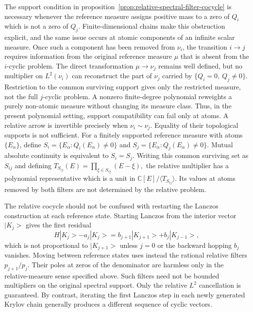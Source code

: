 \documentclass[a4paper,11pt]{article}
\def\ket#1{|#1>}%
\theoremstyle{definition}
\theoremstyle{remark}
\newcommand{\ket}[1]{|#1\rangle}
\newcommand{\CC}{\mathbb C}
\begin{document}
The support condition in proposition~\ref{prop:relative-spectral-filter-cocycle} is necessary whenever the reference measure assigns positive mass to a zero of $Q_i$ which is not a zero of $Q_j$. Finite-dimensional chains make this obstruction explicit, and the same issue occurs at atomic components of an infinite scalar measure. Once such a component has been removed from $\nu_i$, the transition $i\to j$ requires information from the original reference measure $\mu$ that is absent from the $i$-cyclic problem. The direct transformation $\mu\to\nu_j$ remains well defined, but no multiplier on $L^2(\nu_i)$ can reconstruct the part of $\nu_j$ carried by $\{Q_i=0,\ Q_j\ne0\}$. Restriction to the common surviving support gives only the restricted measure, not the full $j$-cyclic problem. A nonzero finite-degree polynomial reweights a purely non-atomic measure without changing its measure class. Thus, in the present polynomial setting, support compatibility can fail only at atoms. A relative arrow is invertible precisely when
$\nu_i\sim\nu_j$. Equality of their topological supports is not sufficient. For a finitely supported reference measure with atoms $\{E_\alpha\}$, define
$
   S_i=\{E_\alpha:Q_i(E_\alpha)\ne0\}
$
and
$
   S_j=\{E_\alpha:Q_j(E_\alpha)\ne0\}.
$
Mutual absolute continuity is equivalent to $S_i=S_j$. Writing this common surviving set as $S_{ij}$ and defining
$
   T_{S_{ij}}(E)=\prod_{\xi\in S_{ij}}(E-\xi),
$
the relative multiplier has a polynomial representative which is a unit in
$\CC[E]/\langle T_{S_{ij}}\rangle$. Its values at atoms removed by both filters are not determined by the relative problem.

The relative cocycle should not be confused with restarting the Lanczos construction at each reference state. Starting Lanczos from the interior vector $\ket{K_j}$ gives the first residual
\begin{equation}
   H\ket{K_j}-a_j\ket{K_j}
   =
   b_{j+1}\ket{K_{j+1}}+b_j\ket{K_{j-1}},
   \label{eq:interior-first-residual-main}
\end{equation}
which is not proportional to $\ket{K_{j+1}}$ unless $j=0$ or the backward hopping $b_j$ vanishes. Moving between reference states uses instead the rational relative filters $p_{j+1}/p_j$. Their poles at zeros of the denominator are harmless only in the relative-measure sense specified above. Such filters need not be bounded multipliers on the original spectral support. Only the relative $L^2$ cancellation is guaranteed. By contrast, iterating the first Lanczos step in each newly generated Krylov chain generally produces a different sequence of cyclic vectors.
\end{document}
